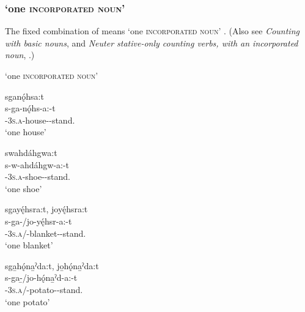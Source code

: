 \subsubsection*{ ‘one \textsc{incorporated noun}’} \label{[s/j/ji-pronominal prefix-incorporated noun-t]}
The fixed combination of  means ‘one \textsc{incorporated noun}’ . (Also see \textit{Counting with basic nouns},  and \textit{Neuter stative-only counting verbs, with an incorporated noun}, .)

\ea\label{ex:pppexpressionex11}  ‘one \textsc{incorporated noun}’

\ea sganǫ́hsa:t\\
\gll s-ga-nǫ́hs-a:-t\\
{\repetitive}-\textsc{3s.a}-house-{\joinerA}-stand.{\stative}\\
\glt `one house'

\ex swahdáhgwa:t\\
\gll s-w-ahdáhgw-a:-t\\
{\repetitive}-\textsc{3s.a}-shoe-{\joinerA}-stand.{\stative}\\
\glt `one shoe'

\ex sgayę́hsra:t, joyę́hsra:t\\
\gll s-ga-/jo-yę́hsr-a:-t\\
{\repetitive}-\textsc{3s.a}/-blanket-{\joinerA}-stand.{\stative}\\
\glt `one blanket'

\ex sga̱hǫ́na̱ˀda:t, jo̱hǫ́na̱ˀda:t\\
\gll s-ga-̱/jo-hǫ́na̱ˀd-a:-t\\
{\repetitive}-\textsc{3s.a}/-potato-{\joinerA}-stand.{\stative}\\
\glt `one potato'
\z
\z


